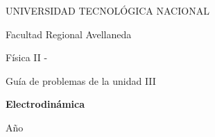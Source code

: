 \begin{titlepage}
    \begin{center}
    \vspace{1.5cm}
    


    \end{center}

    \begin{center}
        {\LARGE UNIVERSIDAD TECNOLÓGICA NACIONAL}\par\medskip
        \vspace*{0.25cm}
        {\LARGE Facultad Regional Avellaneda}\par\medskip
        \vspace*{1cm}
        {\Huge Física II - \comision}\par\medskip
        \vspace*{0.5cm}
        {\LARGE Guía de problemas de la unidad III}\par\bigskip
        \vspace*{1cm}
        {\Huge \bf \color[RGB]{0,121,138} Electrodinámica\par\medskip}
    \end{center}

    \vspace{1cm}

    \begin{center}
        \begin{minipage}[t]{.7\textwidth}
            \renewcommand*{\contentsname}{Contenidos}
            \tableofcontents
        \end{minipage}
        \vspace*{\fill}
    \end{center}
    \begin{center}
        Año \anio
    \end{center}

    \end{titlepage}


